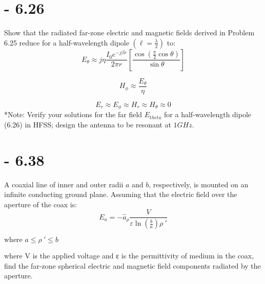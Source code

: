 \documentclass[12pt]{article}
\begin{document}
\section{- 6.26}
 Show that the radiated far-zone electric and magnetic fields derived in Problem 6.25 reduce for a half-wavelength dipole $(\ell = \frac{\lambda}{2})$ to:
\[
E_{\theta} \approx j \eta \frac{I_0 e^{-j \beta r}}{2\pi r} 
\left[\frac{\cos\left(\frac{\pi}{2} \cos \theta\right)}{
\sin \theta}\right]
\]

\[
H_{\phi} \approx \frac{E_{\theta}}{\eta}
\]

\[
E_r \approx E_{\phi} \approx H_r \approx H_{\theta} \approx 0
\]
*Note: Verify your solutions for the far field $E_{theta}$ for a half-wavelength dipole (6.26) in HFSS; design the antenna to be resonant at $1GHz$.
\newpage
\section{- 6.38}
A coaxial line of inner and outer radii $a$ and $b$, respectively, is mounted on an infinite
conducting ground plane. Assuming that the electric field over the aperture of the coax is:
\[
E_a = -\hat{a}_{\rho} \frac{V}{\varepsilon \ln(\frac{b}{a}) \rho\ '}
\]
\begin{center}
  $\text{where } a \leq \rho\ ' \leq b$
\end{center}
where V is the applied voltage and ε is the permittivity of medium in the coax, find the far-zone spherical electric and magnetic field components radiated by the aperture.
\newpage
\end{document}
